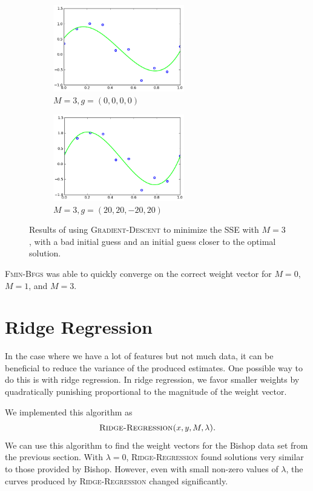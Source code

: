 \documentclass{sigchi}
\begin{document}
\begin{figure}[!t]
\centering
\begin{subfigure}[b]{2.25in}
	\includegraphics[width = 2.25in]{m3_0.png}
	\caption{$M = 3, g = (0, 0, 0, 0)$}
\end{subfigure}
\begin{subfigure}[b]{2.25in}
	\includegraphics[width = 2.25in]{m3_1.png}
	\caption{$M = 3, g = (20, 20, -20, 20)$}
\end{subfigure}
\caption{Results of using \textsc{Gradient-Descent} to minimize the SSE with $M = 3$, with a bad initial guess and an initial guess closer to the optimal solution.}
\end{figure}

\textsc{Fmin-Bfgs} was able to quickly converge on the correct weight vector for $M = 0$, $M = 1$, and $M = 3$.

\section{Ridge Regression}

In the case where we have a lot of features but not much data, it can be beneficial to reduce the variance of the produced estimates. One possible way to do this is with ridge regression. In ridge regression, we favor smaller weights by quadratically punishing proportional to the magnitude of the weight vector.

We implemented this algorithm as
\[\textsc{Ridge-Regression($x, y, M, \lambda$)}.\]
We can use this algorithm to find the weight vectors for the Bishop data set from the previous section. With $\lambda = 0$, \textsc{Ridge-Regression} found solutions very similar to those provided by Bishop. However, even with small non-zero values of $\lambda$, the curves produced by \textsc{Ridge-Regression} changed significantly.
\end{document}
